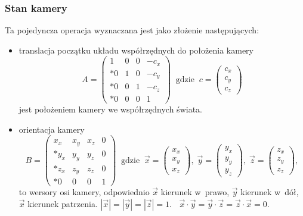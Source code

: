 \documentclass[12pt,a4paper]{article}
\begin{document}
\subsubsection{Stan kamery}
Ta pojedyncza operacja wyznaczana jest jako złożenie następujących:
\begin{itemize}

  \item translacja początku układu współrzędnych do położenia kamery
    \[ A = \left( \begin{array}{cccc}
      1 & 0 & 0 & -c_x \\*
      0 & 1 & 0 & -c_y \\*
      0 & 0 & 1 & -c_z \\*
      0 & 0 & 0 & 1
    \end{array} \right)
    \;\;\mbox{gdzie}\;\;
    c = \left( \begin{array}{c}
      c_x \\ c_y \\ c_z
    \end{array} \right)
    \]
    jest położeniem kamery we współrzędnych świata.

  \item orientacja kamery
    \[ B = \left( \begin{array}{cccc}
      x_x & x_y & x_z & 0 \\*
      y_x & y_y & y_z & 0 \\*
      z_x & z_y & z_z & 0 \\*
      0 & 0 & 0 & 1
    \end{array} \right) 
    \;\;\mbox{gdzie}\;\;
    \overset{\rightarrow}{x} = \left( \begin{array}{c}
      x_x \\ x_y \\ x_z
    \end{array} \right),\;
    \overset{\rightarrow}{y} = \left( \begin{array}{c}
      y_x \\ y_y \\ y_z
    \end{array} \right),\;
    \overset{\rightarrow}{z} = \left( \begin{array}{c}
      z_x \\ z_y \\ z_z
    \end{array} \right),
    \]
    to wersory osi kamery, odpowiednio
    $\overset{\rightarrow}{x}$ kierunek w~prawo,
    $\overset{\rightarrow}{y}$ kierunek w~dół,
    $\overset{\rightarrow}{x}$ kierunek patrzenia.\newline
    $ |\overset{\rightarrow}{x}|=|\overset{\rightarrow}{y}|=|\overset{\rightarrow}{z}|=1 $.
    $\;\; \overset{\rightarrow}{x}\cdot\overset{\rightarrow}{y} = 
    \overset{\rightarrow}{y}\cdot\overset{\rightarrow}{z} = 
    \overset{\rightarrow}{z}\cdot\overset{\rightarrow}{x} = 0$.
    

\end{itemize}
\end{document}
